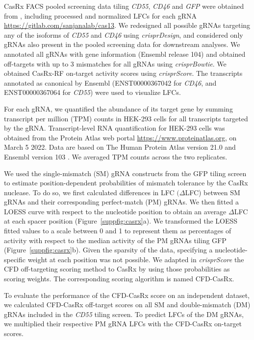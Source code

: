 \documentclass[pdftex,english,10pt]{article}
\begin{document}
{CasRx FACS pooled screening data tiling \textit{CD55}, \textit{CD46} and \textit{GFP} were obtained from \citet{wessels2020massively}, including processed and normalized LFCs for each gRNA \url{https://gitlab.com/sanjanalab/cas13}. We redesigned all possible gRNAs targeting any of the isoforms of \textit{CD55} and \textit{CD46} using \textit{crisprDesign}, and considered only gRNAs also present in the pooled screening data for downstream analyses. We annotated all gRNAs with gene information (Ensembl release 104) and obtained off-targets with up to 3 mismatches for all gRNAs using \textit{crisprBowtie}. 
We obtained CasRx-RF on-target activity scores using \textit{crisprScore}. 
The transcripts annotated as canonical by Ensembl (ENST00000367042 for \textit{CD46}, and ENST00000367064 for \textit{CD55}) were used to visualize LFCs. 

For each gRNA, we quantified the abundance of its target gene by summing transcript per million (TPM) counts in HEK-293 cells for all transcripts targeted by the gRNA. Transcript-level RNA quantification for HEK-293 cells was obtained from the Protein Atlas web portal \url{https://www.proteinatlas.org},
on March 5 2022. Data are based on The Human Protein Atlas version 21.0 and Ensembl version 103 .
We averaged TPM counts across the two replicates. 

We used the single-mismatch (SM) gRNA constructs from the GFP tiling screen to estimate position-dependent probabilities of mismatch tolerance by the CasRx nuclease. To do so, we first calculated differences in LFC $(\Delta$LFC) between SM gRNAs and their corresponding perfect-match (PM) gRNAs. We then fitted a LOESS curve with respect to the nucleotide position to obtain an average $\Delta$LFC at each spacer position (Figure~\ref{suppfig:casrx}a). We transformed the LOESS fitted values to a scale between 0 and 1 to represent them as percentages of activity with respect to the median activity of the PM gRNAs tiling GFP (Figure~\ref{suppfig:casrx}b). Given the sparsity of the data, specifying a nucleotide-specific weight at each position was not possible. We adapted in \textit{crisprScore} the CFD off-targeting scoring method to CasRx by using those probabilities as scoring weights. The corresponding scoring algorithm is named CFD-CasRx. 

To evaluate the performance of the CFD-CasRx score on an independent dataset, we calculated CFD-CasRx off-target scores on all SM and double-mismatch (DM) gRNAs included in the \textit{CD55} tiling screen. To predict LFCs of the DM gRNAs, we multiplied their respective PM gRNA LFCs with the CFD-CasRx on-target scores. 


}
\end{document}

